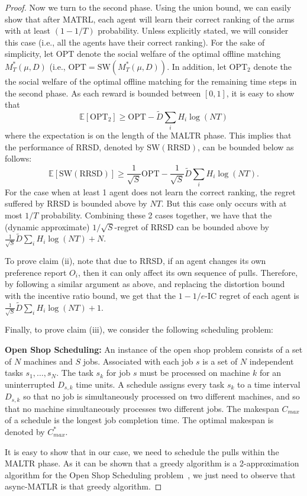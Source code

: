 \documentclass[letterpaper,11pt]{article}
\begin{document}
\begin{proof}
Now we turn to the second phase. Using the union bound, we can easily show that after MATRL, each agent will learn their correct ranking of the arms with at least $(1-1/T)$ probability. Unless explicitly stated, we will consider this case (i.e., all the agents have their correct ranking).
For the sake of simplicity, let $\textrm{OPT}$ denote the social welfare of the optimal offline matching $M^*_T(\mu,D)$ (i.e., $\textrm{OPT} = \textrm{SW}(M^*_T(\mu,D))$. In addition, let $\textrm{OPT}_2$ denote the the social welfare of the optimal offline matching for the remaining time steps in the second phase. As each reward is bounded between $[0,1]$, it is easy to show that
\begin{equation}
   \mathbb{E}\left[\textrm{OPT}_2\right] \geq \textrm{OPT} - \tilde{D}\sum_{i}H_i\log(NT) 
\end{equation}
where the expectation is on the length of the MALTR phase. This implies that the performance of RRSD, denoted by $\textrm{SW}(\textrm{RRSD})$, can be bounded below as follows:
\begin{equation}
   \mathbb{E}\left[\textrm{SW}(\textrm{RRSD})\right] \geq \frac{1}{\sqrt{S}}\textrm{OPT} - \frac{1}{\sqrt{S}}\tilde{D}\sum_{i}H_i\log(NT). 
\end{equation}
For the case when at least 1 agent does not learn the correct ranking, the regret suffered by RRSD is bounded above by $NT$. But this case only occurs with at most $1/T$ probability.
Combining these 2 cases together, we have that the (dynamic approximate) $1/\sqrt{S}$-regret of RRSD can be bounded above by $\frac{1}{\sqrt{S}}\tilde{D}\sum_{i}H_i\log(NT) + N$.

To prove claim (ii), note that due to RRSD, if an agent changes its own preference report $O_i$, then it can only affect its own sequence of pulls. Therefore, by following a similar argument as above, and replacing the distortion bound with the incentive ratio bound, we get that the $1-1/e$-IC regret of each agent is $\frac{1}{\sqrt{S}}\tilde{D}\sum_{i}H_i\log(NT) + 1$.

Finally, to prove claim (iii), we consider the following scheduling problem:

\textbf{Open Shop Scheduling:} An instance of the open shop problem consists of a set of $N$ machines and $S$ jobs. Associated with each job $s$ is a set of $N$ independent tasks $s_{1}, \dots, s_{N}$. The task $s_{k}$ for job $s$ must be processed on machine $k$ for an uninterrupted $D_{s, k}$ time units. A schedule assigns every task $s_{k}$ to a time interval $D_{s, k}$ so that no job is simultaneously processed on two different machines, and so that no machine simultaneously processes two different jobs. The makespan $C_{max}$ of a schedule is the longest job completion time. The optimal makespan is denoted by $C^{*}_{max}$.

It is easy to show that in our case, we need to schedule the pulls within the MALTR phase. As it can be shown that a greedy algorithm is a 2-approximation algorithm for the Open Shop Scheduling problem~\cite{woeginger2018open}, we just need to observe that async-MATLR is that greedy algorithm.
\fi
\end{proof}
\end{document}
